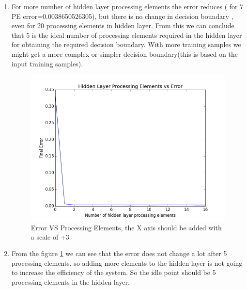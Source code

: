 \documentclass[10pt, letterpaper]{article}
\begin{document}
\begin{enumerate}
\item For more number of hidden layer processing elements the error reduces ( for 7 PE error=0.0038650526305), but there is no change in decision boundary , even for 20 processing elements in hidden layer. From this we can conclude that 5 is the ideal number of processing elements required in the hidden layer for obtaining the required decision boundary. With more training samples we might get a more complex or simpler decision boundary(this is based on the input training samples). 
\begin{figure}[h!]
\centering
\includegraphics[scale=0.75]{ErrorvsPE.png}
\caption{Error VS Processing Elements, the X axis should be added with a scale of $+3$}
\label{fig:Error}
\end{figure}

\item From the figure \ref{fig:Error} we can see that the error does not change a lot after 5 processing elements. so adding more elements to the hidden layer is not going to increase the efficiency of the system. So the idle point should be 5 processing elements in the hidden layer.


\end{enumerate}
\end{document}
